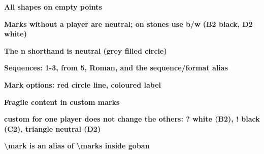 \documentclass{article}
\newcommand\case[1]{\par\medskip\noindent\textbf{#1}\par\nopagebreak}
\begin{document}
\case{All shapes on empty points}
\begin{goban}[7]
\end{goban}

\case{Marks without a player are neutral; on stones use b/w (B2 black, D2 white)}
\begin{goban}[5]
\end{goban}

\case{The n shorthand is neutral (grey filled circle)}
\begin{goban}[5]\end{goban}

\case{Sequences: 1-3, from 5, Roman, and the sequence/format alias}
\begin{goban}[5]
\end{goban}

\case{Mark options: red circle line, coloured label}
\begin{goban}[5]
\end{goban}

\case{Fragile content in custom marks}
\begin{goban}[5]\end{goban}

\case{custom for one player does not change the others: ? white (B2), ! black (C2), triangle neutral (D2)}
\begin{goban}[5]\end{goban}

\case{\textbackslash mark is an alias of \textbackslash marks inside goban}
\begin{goban}[5]\end{goban}
\end{document}
